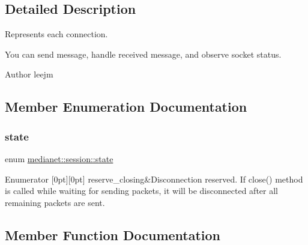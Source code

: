 \subsection{Detailed Description}
Represents each connection. 

You can send message, handle received message, and observe socket status.

\begin{DoxyAuthor}{Author}
leejm 
\end{DoxyAuthor}


\subsection{Member Enumeration Documentation}
\mbox{\label{classmedianet_1_1session_a8ebb6f84fba5564ef87d553c6f823f1e}} 
\subsubsection{\texorpdfstring{state}{state}}
{\footnotesize\ttfamily enum \mbox{\hyperlink{classmedianet_1_1session_a8ebb6f84fba5564ef87d553c6f823f1e}{medianet\+::session\+::state}}}

\begin{DoxyEnumFields}{Enumerator}
[0pt][0pt]{}\mbox{\label{classmedianet_1_1session_a8ebb6f84fba5564ef87d553c6f823f1ead5fee2f76eb10b1d5fe7951bf0b3c216}} 
reserve\+\_\+closing&Disconnection reserved. If close() method is called while waiting for sending packets, it will be disconnected after all remaining packets are sent. \\
\hline

\end{DoxyEnumFields}


\subsection{Member Function Documentation}
\mbox{\label{classmedianet_1_1session_aeac3444d78278559bd2f0b4ac2abf121}} 
